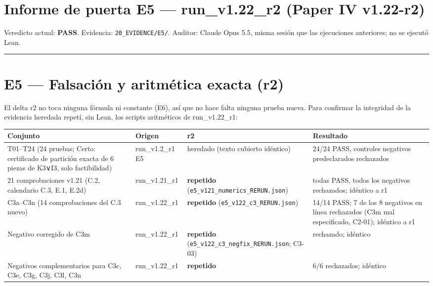 \documentclass[
]{article}
\author{}
\date{}
\newcounter{none} %
\begin{document}
\section{Informe de puerta E5 --- run\_v1.22\_r2 (Paper IV
v1.22-r2)}\label{informe-de-puerta-e5--run_v122_r2-paper-iv-v122-r2}

Veredicto actual: \textbf{PASS}. Evidencia: \texttt{20\_EVIDENCE/E5/}.
Auditor: Claude Opus 5.5, misma sesión que las ejecuciones anteriores;
no se ejecutó Lean.

\begin{center}\rule{0.5\linewidth}{0.5pt}\end{center}

\section{E5 --- Falsación y aritmética exacta
(r2)}\label{e5--falsaciuxf3n-y-aritmuxe9tica-exacta-r2}

El delta r2 no toca ninguna fórmula ni constante (E6), así que no hace
falta ninguna prueba nueva. Para confirmar la integridad de la evidencia
heredada repetí, sin Lean, los scripts aritméticos de run\_v1.22\_r1:

{\def\LTcaptype{none} %
\begin{longtable}[]{@{}llll@{}}
\toprule\noalign{}
Conjunto & Origen & r2 & Resultado \\
\midrule\noalign{}
\endhead
\bottomrule\noalign{}
\endlastfoot
T01--T24 (24 pruebas; Certo: certificado de partición exacta de 6 piezas
de K3∨I3, solo factibilidad) & run\_v1.2\_r1 E5 & heredado (texto
cubierto idéntico) & 24/24 PASS, controles negativos predeclarados
rechazados \\
21 comprobaciones v1.21 (C.2, calendario C.3, E.1, E.2d) &
run\_v1.21\_r1 & \textbf{repetido}
(\texttt{e5\_v121\_numerics\_RERUN.json}) & todas PASS, todos los
negativos rechazados; idéntico a r1 \\
C3a--C3n (14 comprobaciones del C.3 nuevo) & run\_v1.22\_r1 &
\textbf{repetido} (\texttt{e5\_v122\_c3\_RERUN.json}) & 14/14 PASS; 7 de
los 8 negativos en línea rechazados (C3m mal especificado, C2-01);
idéntico a r1 \\
Negativo corregido de C3m & run\_v1.22\_r1 & \textbf{repetido}
(\texttt{e5\_v122\_c3\_negfix\_RERUN.json}; C3-03) & rechazado;
idéntico \\
Negativos complementarios para C3c, C3e, C3g, C3j, C3l, C3n &
run\_v1.22\_r1 & \textbf{repetido} & 6/6 rechazados; idéntico \\
\end{longtable}
}
\end{document}
